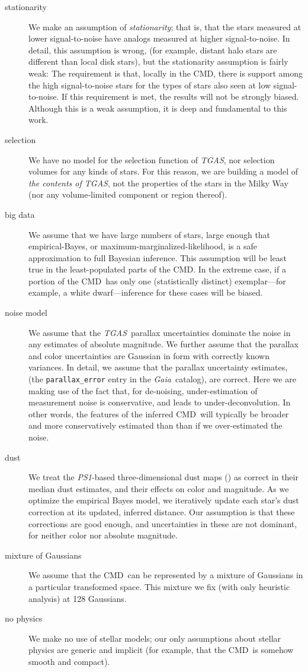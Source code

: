 \documentclass[modern]{aastex61}
\newcommand{\acronym}[1]{{\small{#1}}}
\newcommand{\project}[1]{\textsl{#1}}
\newcommand{\tgas}{\project{\acronym{TGAS}}}
\newcommand{\psone}{\project{\acronym{PS1}}}
\newcommand{\gaia}{\project{Gaia}}
\newcommand{\cmd}{\acronym{CMD}}
\begin{document}
\begin{description}
\item[stationarity] We make an assumption of \emph{stationarity}; that is, that the
  stars measured at lower signal-to-noise have analogs measured at
  higher signal-to-noise.
  In detail, this assumption is wrong, (for example, distant halo stars are different than local
  disk stars), but the stationarity assumption is fairly weak:
  The requirement is that, locally in the \cmd, there is
  support among the high signal-to-noise stars for the types
  of stars also seen at low signal-to-noise.
  If this requirement is met, the results will not be
  strongly biased. Although this is a weak assumption, it is deep and fundamental to this
  work.
\item[selection] We have no model for the selection function of \tgas,
  nor selection volumes for any kinds of stars.
  For this reason, we are building a model of \emph{the contents of \tgas}, not the
  properties of the stars in the Milky Way (nor any volume-limited component or region
  thereof).
\item[big data] We assume that we have large numbers of stars, large enough that
  empirical-Bayes, or maximum-marginalized-likelihood, is a safe
  approximation to full Bayesian inference. This assumption will be
  least true in the least-populated parts of the \cmd. In the extreme
  case, if a portion of the \cmd\ has only one (statistically distinct)
  exemplar---for example, a white dwarf---inference for these cases will be biased.
\item[noise model] We assume that the \tgas\ parallax uncertainties dominate the
  noise in any estimates of absolute magnitude. We further assume that
  the parallax and color uncertainties are Gaussian in form with
  correctly known variances. In detail, we assume that the parallax uncertainty estimates,
  (the \texttt{parallax{\_}error} entry in the \gaia\ catalog), are correct.
  Here we are making use of the fact that, for
  de-noising, under-estimation of measurement noise is conservative, and leads to under-deconvolution. In other words, the features of the inferred \cmd\ will typically be broader and more conservatively estimated than than if we over-estimated the noise.
\item[dust] We treat the \psone-based three-dimensional dust maps (\citealt{green15})
  as correct in their median dust estimates, and their
  effects on color and magnitude. As we optimize the empirical Bayes model, we iteratively update each star's
  dust correction at its updated, inferred distance. Our assumption is that these corrections are
  good enough, and uncertainties in these are not dominant, for neither
  color nor absolute magnitude.
\item[mixture of Gaussians] We assume that the \cmd\ can be represented by a mixture of
  Gaussians in a particular transformed space. This mixture we fix
  (with only heuristic analysis) at 128 Gaussians.
\item[no physics] We make no use of stellar models; our only assumptions about
  stellar physics are generic and implicit (for example, that the
  \cmd\ is somehow smooth and compact).
\end{description}
\end{document}
